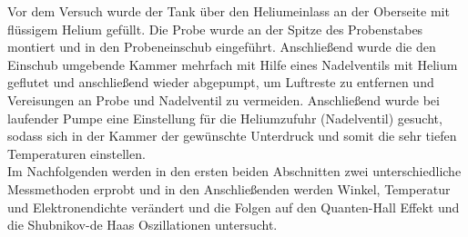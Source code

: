 Vor dem Versuch wurde der Tank über den Heliumeinlass an der Oberseite mit flüssigem Helium gefüllt. Die Probe wurde an der Spitze des Probenstabes montiert und in den Probeneinschub eingeführt. Anschließend wurde die den Einschub umgebende Kammer mehrfach mit Hilfe eines Nadelventils mit Helium geflutet und anschließend wieder abgepumpt, um Luftreste zu entfernen und Vereisungen an Probe und Nadelventil zu vermeiden. Anschließend wurde bei laufender Pumpe eine Einstellung für die Heliumzufuhr (Nadelventil) gesucht, sodass sich in der Kammer der gewünschte Unterdruck und somit die sehr tiefen Temperaturen einstellen.\\

Im Nachfolgenden werden in den ersten beiden Abschnitten zwei unterschiedliche Messmethoden erprobt und in den Anschließenden werden Winkel, Temperatur und Elektronendichte verändert und die Folgen auf den Quanten-Hall Effekt und die Shubnikov-de Haas Oszillationen untersucht.